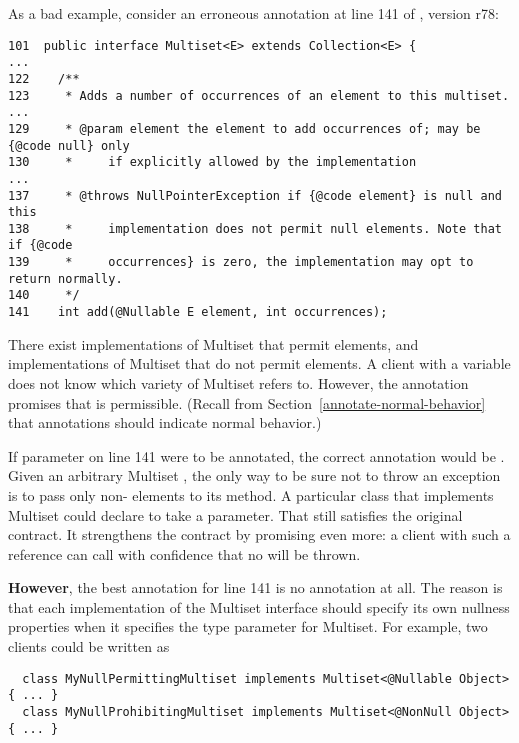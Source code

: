 As a bad example, consider an erroneous  annotation at
line 141 of , version r78:

\begin{Verbatim}
101  public interface Multiset<E> extends Collection<E> {
...
122    /**
123     * Adds a number of occurrences of an element to this multiset.
...
129     * @param element the element to add occurrences of; may be {@code null} only
130     *     if explicitly allowed by the implementation
...
137     * @throws NullPointerException if {@code element} is null and this
138     *     implementation does not permit null elements. Note that if {@code
139     *     occurrences} is zero, the implementation may opt to return normally.
140     */
141    int add(@Nullable E element, int occurrences);
\end{Verbatim}

There exist implementations of Multiset that permit  elements,
and implementations of Multiset that do not permit  elements.  A
client with a variable  does not know which variety of
Multiset  refers to.  However, the  annotation
promises that  is permissible.  (Recall from
Section~\ref{annotate-normal-behavior} that annotations should indicate
normal behavior.)

If parameter  on line 141 were to be annotated, the correct
annotation would be .  Given an arbitrary Multiset
, the only way to be sure not to throw an exception is to pass
only non- elements to its  method.  A particular class
that implements Multiset could declare  to take a
 parameter.  That still satisfies the original contract.
It strengthens the contract by promising even more:  a client with such a
reference can call  with confidence that no
 will be thrown.

\textbf{However}, the best annotation for line 141 is no annotation at all.
The reason is that each implementation of the Multiset interface should
specify its own nullness properties when it specifies the type parameter
for Multiset.  For example, two clients could be written as

\begin{Verbatim}
  class MyNullPermittingMultiset implements Multiset<@Nullable Object> { ... }
  class MyNullProhibitingMultiset implements Multiset<@NonNull Object> { ... }
\end{Verbatim}

